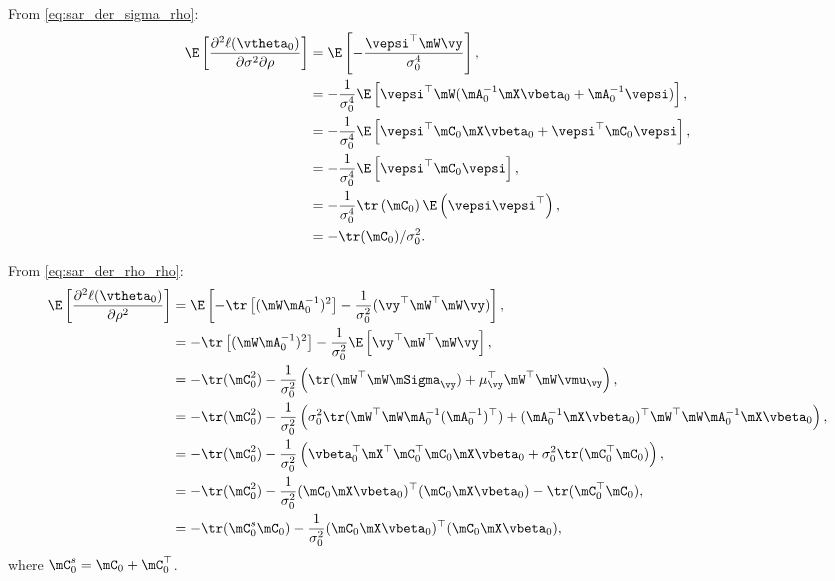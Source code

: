 \documentclass[english,12pt]{book}\usepackage[]{graphicx}\usepackage[]{xcolor}
\begin{document}
\begin{subappendices}
From \eqref{eq:sar_der_sigma_rho}:
\begin{equation}\label{eq:E_der_sigma_rho}
	\begin{aligned}
	\E\left[\frac{\partial^2 \ell(\vtheta_0)}{\partial \sigma^2 \partial \rho}\right] &= \E\left[-\frac{\vepsi^\top\mW\vy}{\sigma^4_0}\right], \\
	& = - \frac{1}{\sigma^4_0}\E\left[\vepsi^\top\mW(\mA^{-1}_0\mX\vbeta_0 + \mA^{-1}_0\vepsi)\right], \\
	& = - \frac{1}{\sigma^4_0}\E\left[\vepsi^\top\mC_0\mX\vbeta_0 + \vepsi^\top\mC_0\vepsi\right], \\
	& = - \frac{1}{\sigma^4_0}\E\left[\vepsi^\top\mC_0\vepsi\right], \\
	& = - \frac{1}{\sigma^4_0}\tr\left(\mC_0\right) \E\left(\vepsi\vepsi^\top\right), \\
	& = - \tr(\mC_0)/\sigma^2_0.
	\end{aligned}
\end{equation}

From \eqref{eq:sar_der_rho_rho}:
\begin{equation}\label{eq:E_der_rho_rho}
  \begin{aligned}
\E\left[\frac{\partial^2 \ell(\vtheta_0)}{\partial \rho ^2}\right]  & =  \E\left[- \tr\left[(\mW\mA_0^{-1})^2\right] - \frac{1}{\sigma^2_0}(\vy^{\top}\mW^{\top}\mW\vy)\right], \\
  & =  - \tr\left[(\mW\mA^{-1}_0)^2\right] - \frac{1}{\sigma^2_0} \E\left[\vy^{\top}\mW^{\top}\mW\vy\right], \\
  & = - \tr(\mC_0^2) -\frac{1}{\sigma^2_0} \left(\tr(\mW^{\top}\mW\mSigma_{\vy}) + \mu_{\vy}^\top\mW^{\top}\mW\vmu_{\vy}\right), \\
  & = - \tr(\mC_0^2) -\frac{1}{\sigma^2_0}\left(\sigma_0^2\tr(\mW^{\top}\mW\mA_0^{-1}(\mA_0^{-1})^\top) + (\mA_0^{-1}\mX\vbeta_0)^\top\mW^{\top}\mW\mA_0^{-1}\mX\vbeta_0\right), \\
 & = - \tr(\mC_0^2) - \frac{1}{\sigma^2_0}\left(\vbeta_0^\top\mX^\top\mC_0^\top\mC_0\mX\vbeta_0 + \sigma_0^2\tr(\mC_0^\top\mC_0)\right), \\
 & = - \tr(\mC_0^2) - \frac{1}{\sigma^2_0}(\mC_0\mX\vbeta_0)^\top(\mC_0\mX\vbeta_0) - \tr(\mC_0^\top\mC_0), \\
 & = - \tr(\mC_0^s\mC_0) - \frac{1}{\sigma^2_0}(\mC_0\mX\vbeta_0)^\top(\mC_0\mX\vbeta_0),
\end{aligned}
\end{equation}
%
where $\mC_0^s = \mC_0 + \mC_0^\top$. 


\end{subappendices}
\end{document}
